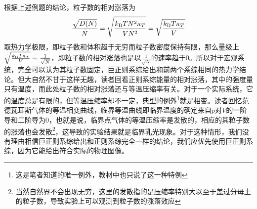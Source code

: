 \documentclass[../../main.tex]{subfiles}
\begin{document}
根据上述例题的结论，粒子数的相对涨落为
\begin{equation}
    \frac{\sqrt{D(N)}}{\bar{N}}=\sqrt{\frac{k_{\mathrm{B}} T\bar{N}^2\kappa_T}{V\bar{N}^2}}=\sqrt{\frac{k_{\mathrm{B}} T\kappa_T}{V}}
\end{equation}
取热力学极限，即粒子数和体积趋于无穷而粒子数密度保持有限，那么量级上\(\sqrt{\frac{k_{\mathrm{B}} T\kappa_T}{V}}\sim\frac{1}{\sqrt{N}}\)，即粒子数的相对涨落也是以\(\frac{1}{\sqrt{N}}\)的速率趋于0。所以对于宏观系统，完全可以认为其粒子数固定，巨正则系综给出和前两个系综相同的热力学结论。但大自然不甘于这样无趣，读者回看正则系综能量的相对涨落，其中的强度量只有温度，而此处粒子数的相对涨落还与等温压缩率有关。对于一个实际系统，它的温度总是有限的，但等温压缩率却不一定，典型的例外\footnote{这是笔者知道的唯一例外，教材中也只说了这一种特例}就是相变。读者回忆范德瓦耳斯气体的等温相变曲线，临界等温曲线即临界温度的确定来自\(p\)对\(V\)的一阶导和二阶导为0，也就是说，临界点气体的等温压缩率是发散的，相应的其粒子数的涨落也会发散\footnote{当然自然界不会出现无穷，这里的发散指的是压缩率特别大以至于盖过分母上的粒子数，导致实验上可以观测到粒子数的涨落效应}，这导致的实验结果就是临界乳光现象。对于这种情形，我们没有理由相信巨正则系综给出和正则系综完全一样的结论，我们应优先使用巨正则系综，因为它能给出符合实际的物理图像。
\end{document}
